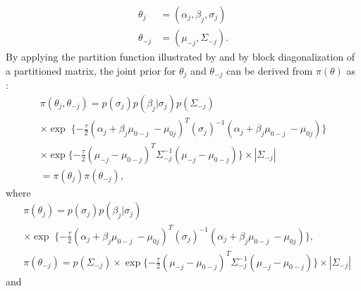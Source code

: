 	\begin{equation}
		\begin{array}{cc}
			\theta_{j}  &= (\alpha_j, \beta_{j}, \sigma_{j})\\
			\theta_{-j} &= (\mu_{-j}, \Sigma_{-j}).
		\end{array}
	\end{equation}
	By applying the partition function illustrated by \citet[p. 165]{Eation2007} and by block diagonalization of a partitioned matrix, the joint prior for $\theta_{j}$ and $\theta_{-j}$ can be derived from $\pi(\theta)$ as :
	\begin{equation}
		\begin{array}{l}
			\pi(\theta_{j}, \theta_{-j}) = p(\sigma_{j})p(\beta_{j}|\sigma_{j})p(\Sigma_{-j})\\
			\times \exp\;\{-\frac{\tau}{2}(\alpha_{j} + \beta_{j}\mu_{0-j}\ - \mu_{0j})^{T}(\sigma_{j})^{-1}(\alpha_{j} + \beta_{j}\mu_{0-j}\ - \mu_{0j})\}\\
			\times \exp\{-\frac{\tau}{2}(\mu_{-j}-\mu_{0-j})^{T}\Sigma_{-j}^{-1}(\mu_{-j}-\mu_{0-j})\} \times |\Sigma_{-j}|\\
			=\pi(\theta_{j})\pi(\theta_{-j}),
		\end{array}
	\end{equation}
	where
	\begin{align}
		&\pi(\theta_{j}) = p(\sigma_{j})p(\beta_{j}|\sigma_{j}) \nonumber\\
		&\times \exp\;\{-\frac{\tau}{2}(\alpha_{j} + \beta_{j}\mu_{0-j}\ - \mu_{0j})^{T}(\sigma_{j})^{-1}(\alpha_{j} + \beta_{j}\mu_{0-j}\ - \mu_{0j})\},\\
		&\pi(\theta_{-j}) = p(\Sigma_{-j})\times \exp\{-\frac{\tau}{2}(\mu_{-j}-\mu_{0-j})^{T}\Sigma_{-j}^{-1}(\mu_{-j}-\mu_{0-j})\} \times |\Sigma_{-j}|
	\end{align}
	and 
	
